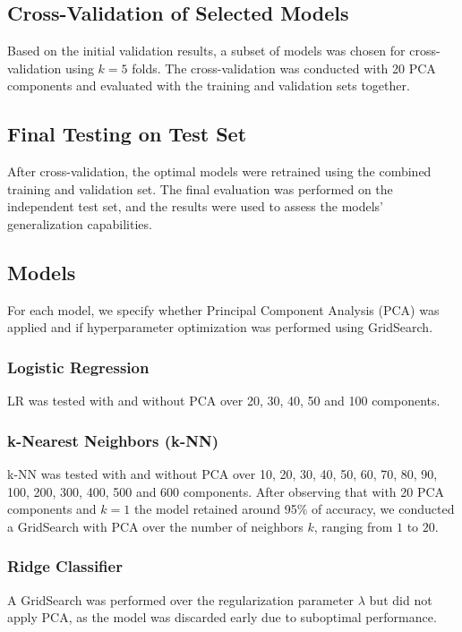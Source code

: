 \documentclass[twocolumn]{article}
\begin{document}
\subsection{Cross-Validation of Selected Models}
Based on the initial validation results, a subset of models was chosen for cross-validation using \( k = 5 \) folds. 
The cross-validation was conducted with 20 PCA components and evaluated with the training and validation sets together.

\subsection{Final Testing on Test Set}
After cross-validation, the optimal models were retrained using the combined training and validation set. The final evaluation was 
performed on the independent test set, and the results were used to assess the models' generalization capabilities.

\subsection{Models}\label{sec:models}
For each model, we specify whether Principal Component Analysis (PCA) was applied and if hyperparameter optimization was performed using GridSearch.

\subsubsection{Logistic Regression}
LR was tested with and without PCA over 20, 30, 40, 50 and 100 components. 

\subsubsection{k-Nearest Neighbors (k-NN)}
k-NN was tested with and without PCA over 10, 20, 30, 40, 50, 60, 70, 80, 90, 100, 200, 300, 400, 500 and 600 components. After observing that with 20 PCA components and \( k=1 \) the model retained around 95\% of accuracy,
we conducted a GridSearch with PCA over the number of neighbors \( k \), ranging from \( 1 \) to \( 20 \).

\subsubsection{Ridge Classifier}
A GridSearch was performed over the regularization parameter \( \lambda \) but did not apply PCA, as the model was discarded early due to suboptimal performance.
\end{document}
